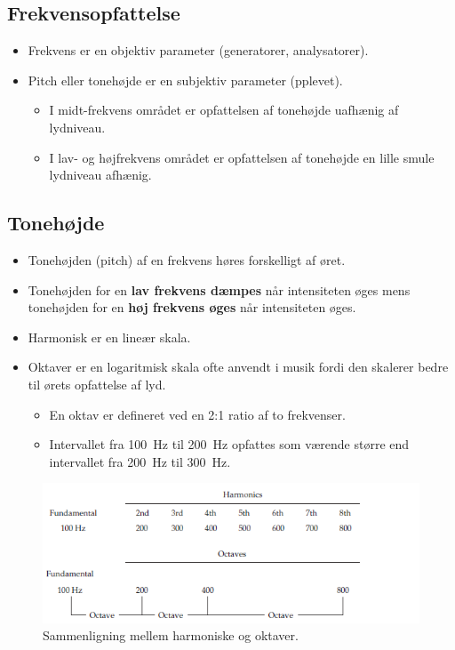 \subsection{Frekvensopfattelse}
\begin{itemize}
	\item Frekvens er en objektiv parameter (generatorer, analysatorer).
	\item Pitch eller tonehøjde er en subjektiv parameter (pplevet).
	\begin{itemize}
		\item I midt-frekvens området er opfattelsen af	tonehøjde uafhænig af lydniveau.
		\item I lav- og højfrekvens området er opfattelsen af tonehøjde en lille smule lydniveau afhænig.
	\end{itemize}
\end{itemize}

\subsection{Tonehøjde}
\begin{itemize}
	\item Tonehøjden (pitch) af en frekvens høres forskelligt af øret.
	\item Tonehøjden for en \textbf{lav frekvens dæmpes} når intensiteten øges mens tonehøjden for en \textbf{høj frekvens øges} når intensiteten øges.
	\item Harmonisk er en lineær skala.
	\item Oktaver er en logaritmisk skala ofte anvendt i musik fordi den skalerer bedre til ørets opfattelse af lyd. 
	\begin{itemize}
		\item En oktav er defineret ved en 2:1 ratio af to frekvenser. 
		\item Intervallet fra \SI{100}{\hertz} til \SI{200}{\hertz} opfattes som værende større end intervallet fra \SI{200}{\hertz} til \SI{300}{\hertz}. 
	\end{itemize}
\end{itemize}

\begin{figure} [H]
	\centering
	\includegraphics[width=\linewidth]{graphics/3.png}
	\caption{Sammenligning mellem harmoniske og oktaver. }
	\label{fig:3}
\end{figure}

